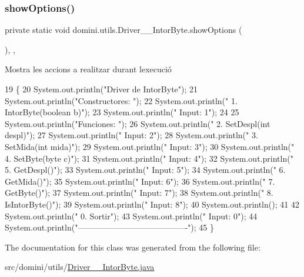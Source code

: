 \subsubsection{\texorpdfstring{show\+Options()}{showOptions()}}
{\footnotesize\ttfamily private static void domini.\+utils.\+Driver\+\_\+\+\_\+\+Intor\+Byte.\+show\+Options (\begin{DoxyParamCaption}{ }\end{DoxyParamCaption})\hspace{0.3cm}{\ttfamily [inline]}, {\ttfamily [static]}, {\ttfamily [private]}}



Mostra les accions a realitzar durant l\textquotesingle{}execució 


\begin{DoxyCode}
19                                      \{
20         System.out.println(\textcolor{stringliteral}{"Driver de IntorByte"});
21         System.out.println(\textcolor{stringliteral}{"Constructores: "});
22         System.out.println(\textcolor{stringliteral}{"     1. IntorByte(boolean b)"});
23         System.out.println(\textcolor{stringliteral}{"     Input: 1"});
24 
25         System.out.println(\textcolor{stringliteral}{"Funciones: "});
26         System.out.println(\textcolor{stringliteral}{"     2. SetDespl(int despl)"});
27         System.out.println(\textcolor{stringliteral}{"     Input: 2"});
28         System.out.println(\textcolor{stringliteral}{"     3. SetMida(int mida)"});
29         System.out.println(\textcolor{stringliteral}{"     Input: 3"});
30         System.out.println(\textcolor{stringliteral}{"     4. SetByte(byte c)"});
31         System.out.println(\textcolor{stringliteral}{"     Input: 4"});
32         System.out.println(\textcolor{stringliteral}{"     5. GetDespl()"});
33         System.out.println(\textcolor{stringliteral}{"     Input: 5"});
34         System.out.println(\textcolor{stringliteral}{"     6. GetMida()"});
35         System.out.println(\textcolor{stringliteral}{"     Input: 6"});
36         System.out.println(\textcolor{stringliteral}{"     7. GetByte()"});
37         System.out.println(\textcolor{stringliteral}{"     Input: 7"});
38         System.out.println(\textcolor{stringliteral}{"     8. IsIntorByte()"});
39         System.out.println(\textcolor{stringliteral}{"     Input: 8"});
40         System.out.println();
41 
42         System.out.println(\textcolor{stringliteral}{"     0. Sortir"});
43         System.out.println(\textcolor{stringliteral}{"     Input: 0"});
44         System.out.println(\textcolor{stringliteral}{"----------------------------------------"});
45     \}
\end{DoxyCode}


The documentation for this class was generated from the following file\+:\begin{DoxyCompactItemize}
\item 
src/domini/utils/\hyperlink{Driver____IntorByte_8java}{Driver\+\_\+\+\_\+\+Intor\+Byte.\+java}\end{DoxyCompactItemize}
